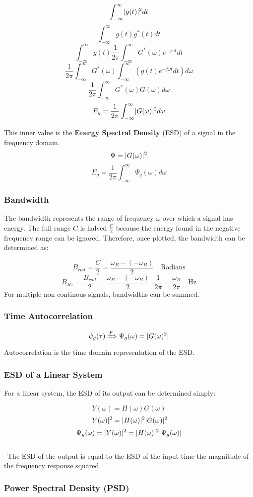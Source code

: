 \documentclass[11pt]{article}
\DeclarePairedDelimiter{\abs}{\lvert}{\rvert}
\begin{document}
$$\int^{\infty}_{-\infty}\abs{g(t)}^2dt$$
$$\int^{\infty}_{-\infty}g(t)g^*(t)dt$$
$$\int^{\infty}_{-\infty}g(t)\frac{1}{2\pi}\int^{\infty}_{-\infty}G^*(\omega)e^{-j\omega t}dt$$
$$\frac{1}{2\pi}\int^{\infty}_{-\infty}G^*(\omega)\int^{\infty}_{-\infty}(g(t)e^{-j\omega t}dt)d\omega$$
$$\frac{1}{2\pi}\int^{\infty}_{-\infty}G^*(\omega)G(\omega)d\omega$$
$$E_g = \frac{1}{2\pi}\int^{\infty}_{-\infty}\abs{G(\omega)}^2d\omega$$

This inner value is the \textbf{Energy Spectral Density} (ESD) of a signal in the frequency domain. \\ 

$$\Psi = \abs{G(\omega)}^2$$
$$E_g = \frac{1}{2\pi}\int^{\infty}_{-\infty}\Psi_g(\omega)d\omega$$

\subsubsection{Bandwidth}
The bandwidth represents the range of frequency $\omega$ over which a signal has energy. The full range $C$ is halved $\frac{C}{2}$ because the energy found in the negative frequency range can be ignored. Therefore, once plotted, the bandwidth can be determined as: 

$$B_{rad} = \frac{C}{2} = \frac{\omega_B - (-\omega_B)}{2} \quad \text{Radians}$$
$$B_{Hz} = \frac{B_{rad}}{2} = \frac{\omega_B - (-\omega_B)}{2} \cdot \frac{1}{2\pi} = \frac{\omega_B}{2\pi}\quad \text{Hz}$$
\hfill \break
For multiple non continous signals, bandwidths can be summed.

\subsubsection{Time Autocorrelation}

$$\psi_g(\tau) \xRightarrow{F} \Psi_g(\omega) = \abs{G(\omega)^2}$$
\hfill \break
Autocorrelation is the time domain representation of the ESD.

\subsubsection{ESD of a Linear System}
For a linear system, the ESD of its output can be determined simply:

$$Y(\omega) = H(\omega)G(\omega)$$
$$\abs{Y(\omega)}^2 = \abs{H(\omega)}^2\abs{G(\omega)}^2$$
$$\Psi_y(\omega) = \abs{Y(\omega)}^2 = \abs{H(\omega)}^2\abs{\Psi_g(\omega)}$$
\\\
The ESD of the output is equal to the ESD of the input time the magnitude of the frequency response squared.

\subsubsection{Power Spectral Density (PSD)}
\end{document}
